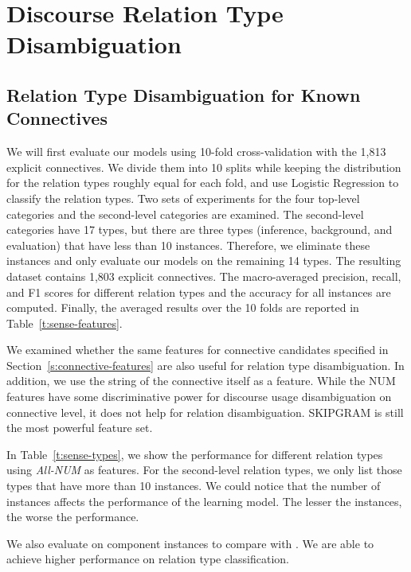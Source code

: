 \section{Discourse Relation Type Disambiguation}

\subsection{Relation Type Disambiguation for Known Connectives}

We will first evaluate our models using 10-fold cross-validation with the 1,813
explicit connectives. We divide them into 10 splits
while keeping the distribution for the relation types roughly equal for
each fold, and use Logistic Regression to classify the relation types.
Two sets of experiments for the four top-level
categories and the second-level categories are examined. The second-level categories
have 17 types, but there are three types (inference, background, and evaluation)
that have less than 10 instances. Therefore, we eliminate these instances and only evaluate
our models on the remaining 14 types. The resulting dataset contains 1,803 explicit
connectives. The macro-averaged
precision, recall, and F1 scores for different relation types and the accuracy for
all instances are computed. Finally, the averaged results over
the 10 folds are reported in Table~\ref{t:sense-features}.

We examined whether the same features
for connective candidates specified in Section~\ref{s:connective-features} are
also useful for relation type disambiguation. In addition, we use the string
of the connective itself as a feature. While the NUM features have some
discriminative power for discourse usage disambiguation on connective level,
it does not help for relation disambiguation. SKIPGRAM is still the most powerful
feature set.



In Table~\ref{t:sense-types}, we show the performance for different relation types
using \textit{All-NUM} as features. For the second-level relation types, we only list
those types that have more than 10 instances. We could notice that the
number of instances affects the performance of the learning model. The
lesser the instances, the worse the performance.



We also evaluate on component instances to compare with \cite{li2015automatic}.
We are able to achieve higher performance on relation type classification.

